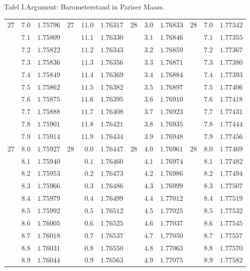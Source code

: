 \begin{GaussVIRefractionPlate}{Tafel I.\quad Argument: Barometerstand in Pariser Maass.}
{\begin{tabular}{rr|r||rr|r||rr|r||rr|r}
$27$ & $7.0$ & $1.75796$ & $27$ & $11.0$ & $1.76317$ & $28$ & $3.0$ & $1.76833$ & $28$ & $7.0$ & $1.77342$\\
 & $7.1$ & $1.75809$ &  & $11.1$ & $1.76330$ &  & $3.1$ & $1.76846$ &  & $7.1$ & $1.77355$\\
 & $7.2$ & $1.75822$ &  & $11.2$ & $1.76343$ &  & $3.2$ & $1.76859$ &  & $7.2$ & $1.77367$\\
 & $7.3$ & $1.75836$ &  & $11.3$ & $1.76356$ &  & $3.3$ & $1.76871$ &  & $7.3$ & $1.77380$\\
 & $7.4$ & $1.75849$ &  & $11.4$ & $1.76369$ &  & $3.4$ & $1.76884$ &  & $7.4$ & $1.77393$\\
 & $7.5$ & $1.75862$ &  & $11.5$ & $1.76382$ &  & $3.5$ & $1.76897$ &  & $7.5$ & $1.77406$\\
 & $7.6$ & $1.75875$ &  & $11.6$ & $1.76395$ &  & $3.6$ & $1.76910$ &  & $7.6$ & $1.77418$\\
 & $7.7$ & $1.75888$ &  & $11.7$ & $1.76408$ &  & $3.7$ & $1.76923$ &  & $7.7$ & $1.77431$\\
 & $7.8$ & $1.75901$ &  & $11.8$ & $1.76421$ &  & $3.8$ & $1.76935$ &  & $7.8$ & $1.77444$\\
 & $7.9$ & $1.75914$ &  & $11.9$ & $1.76434$ &  & $3.9$ & $1.76948$ &  & $7.9$ & $1.77456$\\[4pt]
$27$ & $8.0$ & $1.75927$ & $28$ & $0.0$ & $1.76447$ & $28$ & $4.0$ & $1.76961$ & $28$ & $8.0$ & $1.77469$\\
 & $8.1$ & $1.75940$ &  & $0.1$ & $1.76460$ &  & $4.1$ & $1.76974$ &  & $8.1$ & $1.77482$\\
 & $8.2$ & $1.75953$ &  & $0.2$ & $1.76473$ &  & $4.2$ & $1.76986$ &  & $8.2$ & $1.77494$\\
 & $8.3$ & $1.75966$ &  & $0.3$ & $1.76486$ &  & $4.3$ & $1.76999$ &  & $8.3$ & $1.77507$\\
 & $8.4$ & $1.75979$ &  & $0.4$ & $1.76499$ &  & $4.4$ & $1.77012$ &  & $8.4$ & $1.77519$\\
 & $8.5$ & $1.75992$ &  & $0.5$ & $1.76512$ &  & $4.5$ & $1.77025$ &  & $8.5$ & $1.77532$\\
 & $8.6$ & $1.76005$ &  & $0.6$ & $1.76525$ &  & $4.6$ & $1.77037$ &  & $8.6$ & $1.77545$\\
 & $8.7$ & $1.76018$ &  & $0.7$ & $1.76537$ &  & $4.7$ & $1.77050$ &  & $8.7$ & $1.77557$\\
 & $8.8$ & $1.76031$ &  & $0.8$ & $1.76550$ &  & $4.8$ & $1.77063$ &  & $8.8$ & $1.77570$\\
 & $8.9$ & $1.76044$ &  & $0.9$ & $1.76563$ &  & $4.9$ & $1.77075$ &  & $8.9$ & $1.77582$\\[4pt]

\end{tabular}}
\end{GaussVIRefractionPlate}
